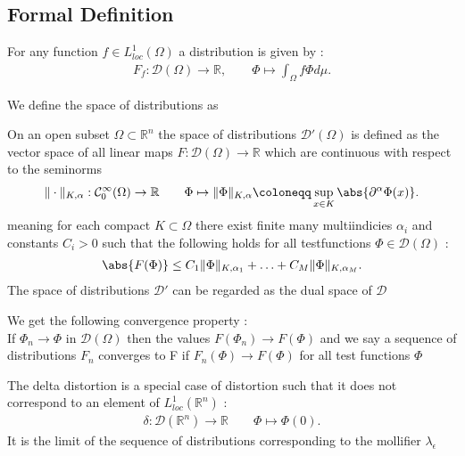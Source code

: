 \subsection{Formal Definition } %
\label{sub:Formal Definition }
\begin{definition}
  For any function $f \in  L_{loc}^{1}(\Omega ) $  a distribution is given by : 
  \begin{align*}
    F_f : \mathcal{D}(\Omega ) \to  \mathbb{R}, \qquad \Phi \mapsto \int_\Omega  f \Phi  d \mu 
  .\end{align*}
\end{definition}
We define the space of distributions as  
\begin{definition}
  On an open subset $\Omega  \subset  \mathbb{R}^{n} $  the space of distributions $\mathcal{D}'(\Omega )$ is 
  defined as the vector space of all linear maps $F: \mathcal{D}(\Omega ) \to \mathbb{R}$ which are continuous with respect to the 
  seminorms 
  \begin{align*}
    \|\cdot \|_{K,\alpha } : \mathcal{C}_0^{\infty}(\Omega ) \to \mathbb{R} \qquad \Phi  \mapsto \|\Phi \|_{K,\alpha } \coloneqq \sup_{x \in  K} \abs{\partial ^{\alpha } \Phi(x) }
  .\end{align*}
  meaning for each compact $K \subset  \Omega $ there exist finite many multiindicies $\alpha_i$ and constants $C_i >0$ such that the following holds 
  for all testfunctions $\Phi  \in  \mathcal{D}(\Omega )$ : 
  \begin{align*}
    \abs{F(\Phi )} \le  C_1\|\Phi \|_{K,\alpha_1} + \ldots + C_M\|\Phi \|_{K,\alpha_M}
  .\end{align*}
  The space of distributions $\mathcal{D}'$ can be regarded as the dual space of $\mathcal{D}$
\end{definition}
\begin{corollary}
 We get the following convergence property : \\[1ex]
 If $\Phi_n \to  \Phi $ in $\mathcal{D}(\Omega )$ then the values  $F(\Phi_n) \to  F(\Phi )$ and 
 we say a sequence of distributions $F_n$ converges to F if $F_n(\Phi ) \to F(\Phi )$ for all test functions $\Phi $
\end{corollary}
\begin{definition}
 The delta distortion is a special case of distortion such that it does not correspond to an element of $L_{loc}^{1 }(\mathbb{R}^{n } ) $ : 
 \begin{align*}
   \delta  : \mathcal{D}(\mathbb{R}^{n} ) \to \mathbb{R} \qquad \Phi  \mapsto \Phi(0)
 .\end{align*}
 It is the limit of the sequence of distributions corresponding to the mollifier $\lambda_\epsilon $
\end{definition}
